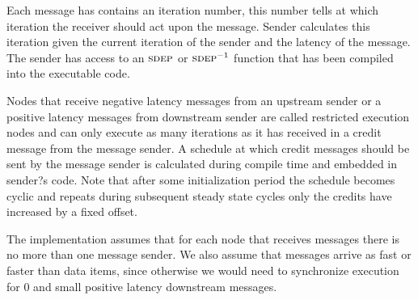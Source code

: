 Each message has contains an iteration number, this number tells at which
iteration the receiver should act upon the message. Sender calculates this
iteration given the current iteration of the sender and the latency of the
message. The sender has access to an $\textsc{sdep}$ or $\textsc{sdep}^{-1}$ function that has been
compiled into the executable code.
                                                                                                     
Nodes that receive negative latency messages from an upstream sender or a
positive latency messages from downstream sender are called restricted
execution nodes and can only execute as many iterations as it has received in a
credit message from the message sender. A schedule at which credit messages
should be sent by the message sender is calculated during compile time and
embedded in sender?s code. Note that after some initialization period the
schedule becomes cyclic and repeats during subsequent steady state cycles only
the credits have increased by a fixed offset.
                                                                                                     
The implementation assumes that for each node that receives messages there is no
more than one message sender. We also assume that messages arrive as fast or
faster than data items, since otherwise we would need to synchronize execution
for 0 and small positive latency downstream messages.
                                                                                                     
